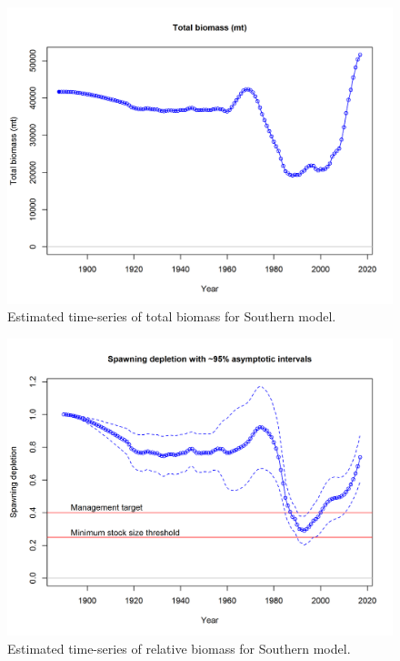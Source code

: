 \documentclass[12pt,]{article}
\begin{document}
\begin{figure}[htbp]
\centering
\includegraphics{r4ss/plots_mod2/ts1_Total_biomass_(mt).png}
\caption{Estimated time-series of total biomass for Southern model.
\label{fig:total_bio.S}}
\end{figure}

\FloatBarrier

\begin{figure}[htbp]
\centering
\includegraphics{r4ss/plots_mod2/ts9_Spawning_depletion_with_95_asymptotic_intervals_intervals.png}
\caption{Estimated time-series of relative biomass for Southern model.
\label{fig:depl.S}}
\end{figure}
\end{document}
